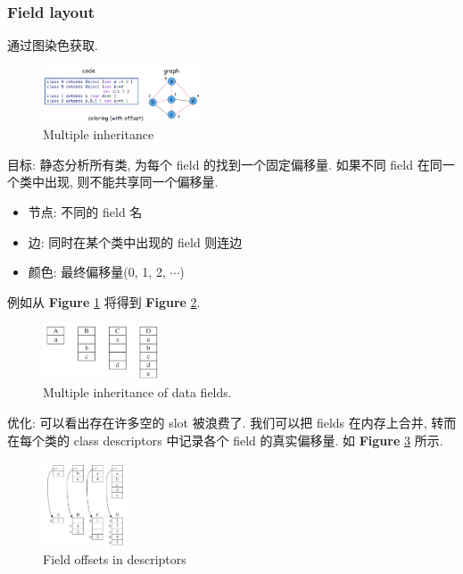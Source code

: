 \subsubsection{Field layout}
通过图染色获取. 

\begin{figure}[!htb]
    \centering
    \includegraphics[width=0.42\textwidth]{pic/CP14/Multiple inheritance}
    \caption{Multiple inheritance}
    \label{fig:Multiple inheritance}
\end{figure}

目标: 静态分析所有类, 为每个 field 的找到一个固定偏移量. 如果不同 field 在同一个类中出现, 则不能共享同一个偏移量. 
\begin{itemize}
    \item 节点: 不同的 field 名
    \item 边: 同时在某个类中出现的 field 则连边
    \item 颜色: 最终偏移量(0, 1, 2, $\cdots$)
\end{itemize}

例如从 \textbf{Figure} \ref{fig:Multiple inheritance} 将得到 \textbf{Figure} \ref{fig:Multiple inheritance of data fields}.

\begin{figure}[!htb]
    \centering
    \includegraphics[width=0.309\textwidth]{pic/CP14/Multiple inheritance of data fields}
    \caption{Multiple inheritance of data fields.}
    \label{fig:Multiple inheritance of data fields}
\end{figure}

优化: 可以看出存在许多空的 slot 被浪费了. 我们可以把 fields 在内存上合并, 转而在每个类的 class descriptors 中记录各个 field 的真实偏移量. 如 \textbf{Figure} \ref{fig:Field offsets in descriptors} 所示. 

\begin{figure}[!htb]
    \centering
    \includegraphics[width=0.22\textwidth]{pic/CP14/Field offsets in descriptors}
    \caption{Field offsets in descriptors}
    \label{fig:Field offsets in descriptors}
\end{figure}

